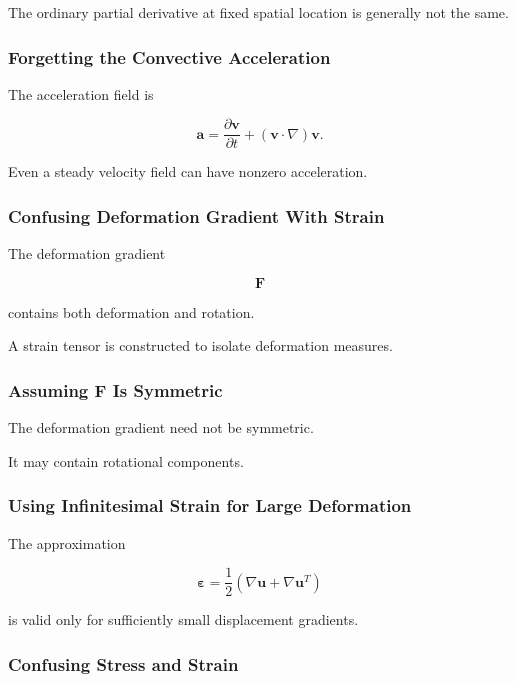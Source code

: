 The ordinary partial derivative at fixed spatial location is generally not
the same.

\subsubsection{Forgetting the Convective Acceleration}

The acceleration field is

\[
\boxed{
\mathbf{a}
=
\frac{\partial\mathbf{v}}{\partial t}
+
(\mathbf{v}\cdot\nabla)\mathbf{v}.
}
\]

Even a steady velocity field can have nonzero acceleration.

\subsubsection{Confusing Deformation Gradient With Strain}

The deformation gradient

\[
\mathbf{F}
\]

contains both deformation and rotation.

A strain tensor is constructed to isolate deformation measures.

\subsubsection{Assuming \(\mathbf{F}\) Is Symmetric}

The deformation gradient need not be symmetric.

It may contain rotational components.

\subsubsection{Using Infinitesimal Strain for Large Deformation}

The approximation

\[
\boldsymbol{\varepsilon}
=
\frac12
\left(
\nabla\mathbf{u}
+
\nabla\mathbf{u}^{T}
\right)
\]

is valid only for sufficiently small displacement gradients.

\subsubsection{Confusing Stress and Strain}

